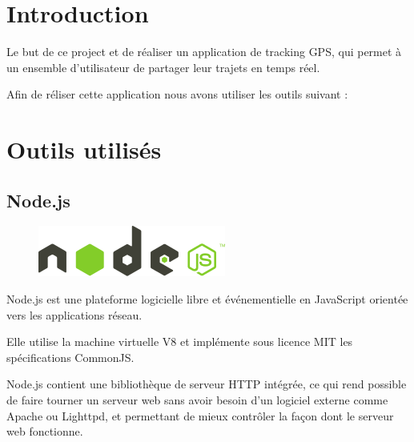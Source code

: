 \documentclass[a4paper]{article}
\begin{document}
\section{Introduction}
Le but de ce project et de réaliser un application de tracking GPS, qui 
permet à un ensemble d'utilisateur de partager leur trajets en temps réel.

Afin de réliser cette application nous avons utiliser les outils suivant :

\section{Outils utilisés}
\subsection{Node.js}

\begin{figure}[H]
  \begin{center}
  \includegraphics[scale=0.5]{nodejs.png}
  \end{center}
\end{figure}

Node.js est une plateforme logicielle libre et événementielle en 
JavaScript orientée vers les applications réseau.

Elle utilise la machine virtuelle V8 et implémente sous 
licence MIT les spécifications CommonJS. 

Node.js contient une bibliothèque de 
serveur HTTP intégrée, ce qui rend possible de faire tourner un serveur 
web sans avoir besoin d'un logiciel externe comme Apache ou Lighttpd, 
et permettant de mieux contrôler la façon dont le serveur web fonctionne.
\end{document}
